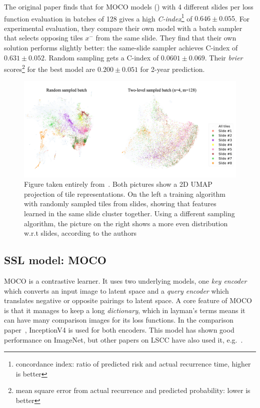 \documentclass[10pt,twocolumn,letterpaper]{article}
\begin{document}
The original paper finds that for \gls{MOCO} models () with 4 different slides per loss function evaluation in batches of 128 gives a high \textit{C-index}\footnote{concordance index: ratio of predicted risk and actual recurrence time, higher is better} of $0.646 \pm 0.055$. For experimental evaluation, they compare their own model with a batch sampler that selects opposing tiles $x^{-}$ from the same slide. They find that their own solution performs slightly better: the same-slide sampler achieves C-index of $0.631 \pm 0.052$. Random sampling gets a C-index of $0.0601 \pm 0.069$. Their \textit{brier} scores\footnote{mean square error from actual recurrence and predicted probability: lower is better} for the best model are $0.200 \pm 0.051$ for 2-year prediction.


\begin{figure}
  \includegraphics[scale=.17]{./umap.png}
  \caption{Figure taken entirely from~\cite{sslUMAP}. Both pictures show a 2D \gls{UMAP} projection of tile representations. On the left a training algorithm with randomly sampled tiles from slides, showing that features learned in the same slide cluster together. Using a different sampling algorithm, the picture on the right shows a more even distribution w.r.t slides, according to the authors}
  \label{fig:umap}
\end{figure}


\subsection{\gls{SSL} model: MOCO}\label{subsec:moco}
\gls{MOCO}\cite{moco} is a contrastive learner. It uses two underlying models, one \textit{key encoder} which converts an input image to latent space and a \textit{query encoder} which translates negative or opposite pairings to latent space. A core feature of \gls{MOCO} is that it manages to keep a long \textit{dictionary}, which in layman's terms means it can have many comparison images for its loss functions. In the comparison paper~\cite{sslUMAP}, InceptionV4\cite{inceptionV4} is used for both encoders. This model has shown good performance on ImageNet, but other papers on \gls{LSCC} have also used it, e.g.~\cite{otherInception}.
\end{document}
